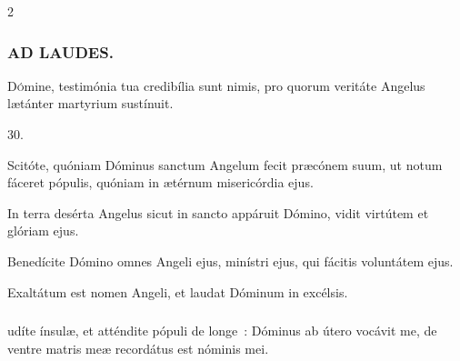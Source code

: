 \documentclass[9pt,twoside]{extarticle}
\begin{document}
\begin{multicols}{2}
\subsubsection*{\center \textsc{AD LAUDES.}}
\begin{center}\end{center}
\lettrine{D}ómine, testimónia tua credibília sunt nimis, pro quorum veritáte Angelus lætánter martyrium sustínuit.

\begin{tightlist}{}
\item {} 30.
\item {} Scitóte, quóniam Dóminus sanctum Angelum fecit præcónem suum, ut notum fáceret pópulis, quóniam in ætérnum misericórdia ejus.
\item {} In terra desérta Angelus sicut in sancto appáruit Dómino, vidit virtútem et glóriam ejus.
\item {} Benedícite Dómino omnes Angeli ejus, minístri ejus, qui fácitis voluntátem ejus.
\item {} Exaltátum est nomen Angeli, et laudat Dóminum in excélsis.
\end{tightlist}

\subsubsection*{}
udíte ínsulæ, et atténdite pópuli de longe~: Dóminus ab útero vocávit me, de ventre matris meæ recordátus est nóminis mei.


\end{multicols}
\end{document}
